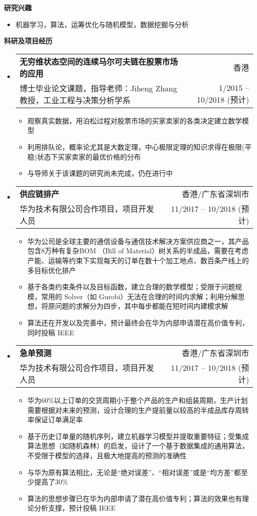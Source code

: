 \documentclass[letterpaper,9pt]{ctexart}
\makeatletter
\newcommand{\resitem}[1]{\item #1 \vspace{-2pt}}
\newcommand{\resheading}[1]{{\large \colorbox{mygrey}{\begin{minipage}{\textwidth}{\textbf{#1 \vphantom{p\^{E}}}}\end{minipage}}}}
\newcommand{\ressubheading}[4]{
\begin{tabular*}{6.5in}{l@{\extracolsep{\fill}}r}
    \textbf{#1} & #2 \\
    #3 & #4 \\
\end{tabular*}\vspace{-6pt}}
\makeatother
\begin{document}
\resheading{研究兴趣}
\begin{itemize}
\item 机器学习，算法，运筹优化与随机模型，数据挖掘与分析
\end{itemize}


\resheading{科研及项目经历}
\begin{itemize}
\item
\ressubheading{无穷维状态空间的连续马尔可夫链在股票市场的应用}{香港}{博士毕业论文课题，指导老师：Jiheng Zhang教授，工业工程与决策分析学系}{1/2015 -- 10/2018 (预计)}
\begin{itemize}
\resitem{观察真实数据，用泊松过程对股票市场的买家卖家的各类决定建立数学模型}
\resitem{利用排队论，概率论尤其是大数定理，中心极限定理的知识求得在极限(平稳)状态下买家卖家的最优价格的分布}
\resitem{与导师关于该课题的研究尚未完成，仍在进行中}
\end{itemize}


\item
\ressubheading{供应链排产}{香港/广东省深圳市}{华为技术有限公司合作项目，项目开发人员}{11/2017 -- 10/2018 (预计)}
\begin{itemize}
\resitem{华为公司是全球主要的通信设备与通信技术解决方案供应商之一，其产品包含8万种有复杂BOM （Bill of Material）树关系的半成品，需要在考虑产能、运输等约束下实现每天的订单在数十个加工地点、数百条产线上的多目标优化排产}
\resitem{基于各类约束条件以及目标函数，建立合理的数学模型；受限于问题规模，常用的 Solver（如 Gurobi）无法在合理的时间内求解；利用分解思想，将原问题的求解分为四步，其中每步都能在短时间内建模求解}
\resitem{算法还在开发以及完善中，预计最终会在华为内部申请潜在高价值专利，同时投稿 IEEE}
\end{itemize}


\item
\ressubheading{急单预测}{香港/广东省深圳市}{华为技术有限公司合作项目，项目开发人员}{11/2017 -- 10/2018 (预计)}
\begin{itemize}
\resitem{华为60\%以上订单的交货周期小于整个产品的生产和组装周期，生产计划需要根据对未来的预测，设计合理的生产提前量以较高的半成品库存周转率保证订单满足率}
\resitem{基于历史订单量的随机序列，建立机器学习模型并提取重要特征；受集成算法思想（如随机森林）的启发，设计了一个基于数据集成的通用算法，不受限于模型的选择，且极大地提高的预测的准确性}
\resitem{与华为原有算法相比，无论是``绝对误差''、``相对误差''或是``均方差''都至少提高了30\%}
\resitem{算法的思想步骤已在华为内部申请了潜在高价值专利；算法的效果也有理论分析支撑，预计投稿 IEEE}
\end{itemize}



\end{itemize}
\end{document}
